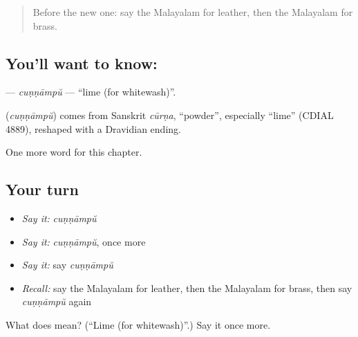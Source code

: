 \label{lesson:ML-C217-cunnampu}



\begin{quote}
Before the new one: say the Malayalam for leather, then the Malayalam for brass.
\end{quote}

\subsection*{You'll want to know: }
\textbf{} — \emph{cuṇṇāmpŭ} — \textquotedblleft{}lime (for whitewash)\textquotedblright{}.

\begin{cousinweb}
\textbf{} (\emph{cuṇṇāmpŭ}) comes from Sanskrit \emph{cūrṇa}, \textquotedblleft{}powder\textquotedblright{}, especially \textquotedblleft{}lime\textquotedblright{} (CDIAL 4889), reshaped with a Dravidian ending.
\end{cousinweb}

\begin{grammarlens}[title={What you've built}]
One more word for this chapter.
\end{grammarlens}

\subsection*{Your turn}
\begin{itemize}
\raggedright
  \item \emph{Say it:} \emph{cuṇṇāmpŭ}
  \item \emph{Say it:} \emph{cuṇṇāmpŭ}, once more
  \item \emph{Say it:} say \emph{cuṇṇāmpŭ}
  \item \emph{Recall:} say the Malayalam for leather, then the Malayalam for brass, then say \emph{cuṇṇāmpŭ} again
\end{itemize}

\begin{tcolorbox}[breakable,colback=teal!4,colframe=teal!35!black,title={Before you move on}]
What does  mean? (\textquotedblleft{}Lime (for whitewash)\textquotedblright{}.) Say it once more.
\end{tcolorbox}
